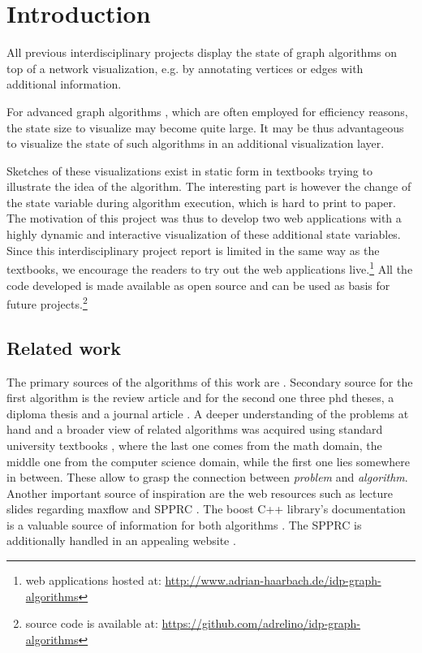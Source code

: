 \chapter{Introduction}\label{ch:1}

All previous interdisciplinary projects \cite{storz2013idp,velden2014idp,sefidgar2015idp,becker2015idp,zoennchen2015idp,fischer2016idp,feil2016idp} display the state of graph algorithms on top of a network visualization, e.g. by annotating vertices or edges with additional information.

For advanced graph algorithms \cite{goldberg1988new,irnich2005shortest}, which are often employed for efficiency reasons, the state size to visualize may become quite large. It may be thus advantageous to visualize the state of such algorithms in an additional visualization layer. 

Sketches of these visualizations exist in static form in textbooks \cite{ahuja1993network,cormen2009introduction,jungnickel2013graphs} trying to illustrate the idea of the algorithm. The interesting part is however the change of the state variable during algorithm execution, which is hard to print to paper. The motivation of this project was thus to develop two web applications with a highly dynamic and interactive visualization of these additional state variables. Since this interdisciplinary project report is limited in the same way as the textbooks, we encourage the readers to try out the web applications live.\footnote{web applications hosted at: \url{http://www.adrian-haarbach.de/idp-graph-algorithms}} All the code developed is made available as open source and can be used as basis for future projects.\footnote{source code is available at: \url{https://github.com/adrelino/idp-graph-algorithms}}

\section{Related work}
The primary sources of the algorithms of this work are \cite{goldberg1988new,irnich2005shortest}. Secondary source for the first algorithm is the review article \cite{goldberg2014efficient} and for the second one three phd theses, a diploma thesis and a journal article \cite{solomon1983vehicle,ziegelmann2001constrained,schlechte2003resource,feillet2004exact,garcia2009resource}.
A deeper understanding of the problems at hand and a broader view of related algorithms was acquired using standard university textbooks \cite{ahuja1993network,cormen2009introduction,jungnickel2013graphs}, where the last one comes from the math domain, the middle one from the computer science domain, while the first one lies somewhere in between. These allow to grasp the connection between \textit{problem} and \textit{algorithm}.
Another important source of inspiration are the web resources such as lecture slides regarding maxflow \cite{mayer2013prakt,mehlhorn2000maximum,williamson2007network,matuschke2016network} and SPPRC \cite{petersen2006label}. The boost C++ library's documentation is a valuable source of information for both algorithms \cite{boost2002push,boost2006rc}. The SPPRC is additionally handled in an appealing website \cite{networking2013vehicle}. %

